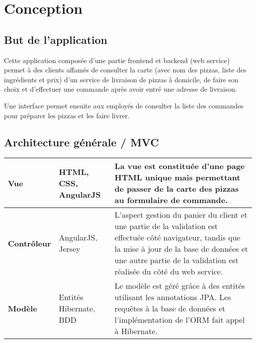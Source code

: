 
\section{Conception}

\subsection{But de l'application}

Cette application composée d'une partie frontend et backend (web service)
permet à des clients affamés de consulter la carte (avec nom des pizzas, liste des ingrédients
et prix) d'un service de livraison de pizzas
à domicile, de faire son choix et d'effectuer une commande après avoir entré une adresse de livraison.

Une interface permet ensuite aux employés de consulter la liste des commandes pour préparer
les pizzas et les faire livrer.

\subsection{Architecture générale / MVC}

\begin{tabular}{| l l p{11cm} |}
\hline
\bf Vue & HTML, CSS, AngularJS & La vue est constituée d'une page HTML unique mais permettant de passer
                                 de la carte des pizzas au formulaire de commande. \\
\hline
\bf Contrôleur & AngularJS, Jersey & L'aspect gestion du panier du client et une partie de la validation
                                     est effectuée côté navigateur, tandis que la mise à jour de la base
                                     de données et une autre partie de la validation est réalisée
                                     du côté du web service. \\
\hline
\bf Modèle & Entités Hibernate, BDD & Le modèle est géré grâce à des entités utilisant les annotations JPA.
                                      Les requêtes à la base de données et l'implémentation de l'ORM
                                      fait appel à Hibernate. \\
    \hline
\end{tabular}


